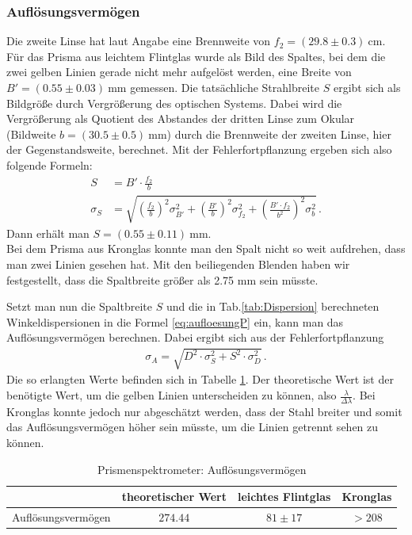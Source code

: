 \documentclass[12pt,a4paper,titlepage,headinclude,bibtotoc]{scrartcl}
\begin{document}
\subsubsection{Auflösungsvermögen}
Die zweite Linse hat laut Angabe eine Brennweite von $f_2=(29.8 \pm 0.3)~$cm.
Für das Prisma aus leichtem Flintglas wurde als Bild des Spaltes, bei dem die zwei gelben Linien gerade nicht mehr aufgelöst werden, eine Breite von $B'=(0.55 \pm 0.03)~$mm gemessen.
Die tatsächliche Strahlbreite $S$ ergibt sich als Bildgröße durch Vergrößerung des optischen Systems.
Dabei wird die Vergrößerung als Quotient des Abstandes der dritten Linse zum Okular (Bildweite $b=(30.5\pm 0.5)~$mm) durch die Brennweite der zweiten Linse, hier der Gegenstandsweite, berechnet.
Mit der Fehlerfortpflanzung ergeben sich also folgende Formeln:
\begin{align}
	S&=B'\cdot\frac{f_2}{b}\\
	\sigma_S&=\sqrt{\left(\frac{f_2}{b}\right)^2\sigma_{B'}^2+\left(\frac{B'}{b}\right)^2\sigma_{f_2}^2+\left(\frac{B' \cdot f_2}{b^2}\right)^2\sigma_b^2}\,.
\end{align}
Dann erhält man $S=(0.55\pm 0.11)~$mm.\\
Bei dem Prisma aus Kronglas konnte man den Spalt nicht so weit aufdrehen, dass man zwei Linien gesehen hat.
Mit den beiliegenden Blenden haben wir festgestellt, dass die Spaltbreite größer als 2.75 mm sein müsste.

Setzt man nun die Spaltbreite $S$ und die in Tab.\ref{tab:Dispersion} berechneten Winkeldispersionen in die Formel \eqref{eq:aufloesungP} ein, kann man das Auflösungsvermögen berechnen.
Dabei ergibt sich aus der Fehlerfortpflanzung
\begin{align}
\sigma_{A}=\sqrt{D^{2} \cdot \sigma_{S}^{2} + S^{2} \cdot \sigma_{D}^{2}}\,.
\end{align}
Die so erlangten Werte befinden sich in Tabelle \ref{tab:prismaA}.
Der theoretische Wert ist der benötigte Wert, um die gelben Linien unterscheiden zu können, also $\frac{\lambda}{\Delta\lambda}$.
Bei Kronglas konnte jedoch nur abgeschätzt werden, dass der Stahl breiter und somit das Auflösungsvermögen höher sein müsste, um die Linien getrennt sehen zu können.

\begin{table}[!htb]
	\centering
	\begin{tabular}{|c|c|c|c|}
		\hline		
		& theoretischer Wert & leichtes Flintglas &  Kronglas \\
		\hline
	    Auflösungsvermögen & $274.44$ & $81 \pm 17$ & $>208$ \\
		\hline		
	\end{tabular}
	\caption{Prismenspektrometer: Auflösungsvermögen}
	\label{tab:prismaA}
\end{table}
\end{document}
